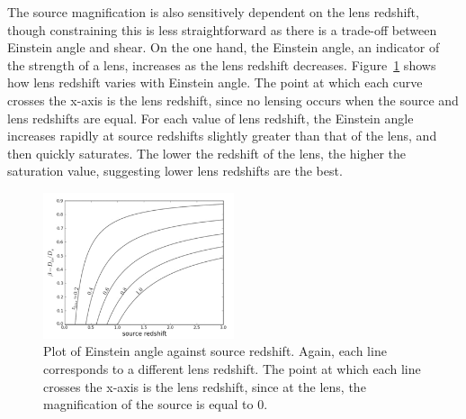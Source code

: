 		The source magnification is also sensitively dependent on the lens redshift, though constraining this is less straightforward as there is a trade-off between Einstein angle and shear. On the one hand, the Einstein angle, an indicator of the strength of a lens, increases as the lens redshift decreases. Figure~\ref{fig:Einstein_angle_as_a_function_of_source_redshift} shows how lens redshift varies with Einstein angle. The point at which each curve crosses the x-axis is the lens redshift, since no lensing occurs when the source and lens redshifts are equal. For each value of lens redshift, the Einstein angle increases rapidly at source redshifts slightly greater than that of the lens, and then quickly saturates\cite{Constraining_source_redshift_distributions}. The lower the redshift of the lens, the higher the saturation value, suggesting lower lens redshifts are the best.
		\begin{figure}[htbp]
			\centering
				\includegraphics[width=0.5\textwidth]{../Images/Einstein_angle_as_a_function_of_source_redshift.png}
			\caption[Einstein angle as a function of source redshift]{\cite{Constraining_source_redshift_distributions} Plot of Einstein angle against source redshift. Again, each line corresponds to a different lens redshift. The point at which each line crosses the x-axis is the lens redshift, since at the lens, the magnification of the source is equal to 0.\label{fig:Einstein_angle_as_a_function_of_source_redshift}}
		\end{figure}

